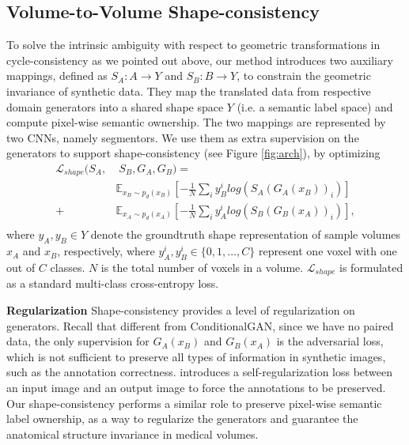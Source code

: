 \documentclass[10pt,twocolumn,letterpaper]{article}
\begin{document}
\subsection{Volume-to-Volume Shape-consistency}
To solve the intrinsic ambiguity with respect to geometric transformations in cycle-consistency as we pointed out above, our method introduces two auxiliary mappings, defined as $S_A: A \rightarrow Y $ and $S_B: B \rightarrow Y$, to constrain the geometric invariance of synthetic data. 
They map the translated data from respective domain generators into a shared shape space $Y$ (i.e. a semantic label space) and compute pixel-wise semantic ownership. The two mappings are represented by two CNNs, namely segmentors. 
We use them as extra supervision on the generators to support shape-consistency (see Figure \ref{fig:arch}), by optimizing
\begin{equation}
\begin{split}
\mathcal{L}_{shape}(S_A, & \; S_B,G_A,G_B) = \\
& \mathbb{E}_{x_B \sim p_{d}(x_B)} [- \frac{1}{N} \sum_{i} y_B^i log(S_A(G_A(x_B))_i)] \\
+ & \mathbb{E}_{x_A \sim p_{d}(x_A)} [ - \frac{1}{N} \sum_{i} y_A^i log(S_B(G_B(x_A))_i)], \\
\end{split}
\end{equation}
where $y_A, y_B \in Y$ denote the groundtruth shape representation of sample volumes $x_A$ and $x_B$, respectively, where $y_A^i, y_B^i \in \{0,1,...,C\}$ represent one voxel with one out of $C$ classes. $N$ is the total number of voxels in a volume. $\mathcal{L}_{shape}$ is formulated as a standard multi-class cross-entropy loss. 

\vspace{.1cm}
\noindent
\textbf{Regularization} Shape-consistency provides a level of regularization on generators. Recall that different from ConditionalGAN, since we have no paired data, the only supervision for $G_A(x_B)$ and $G_B(x_A)$ is the adversarial loss, which is not sufficient to preserve all types of information in synthetic images, such as the annotation correctness. 
\cite{shrivastava2016learning} introduces a self-regularization loss between an input image and an output image to force the annotations to be preserved. Our shape-consistency performs a similar role to preserve pixel-wise semantic label ownership, as a way to regularize the generators and guarantee the anatomical structure invariance in medical volumes.
\end{document}
